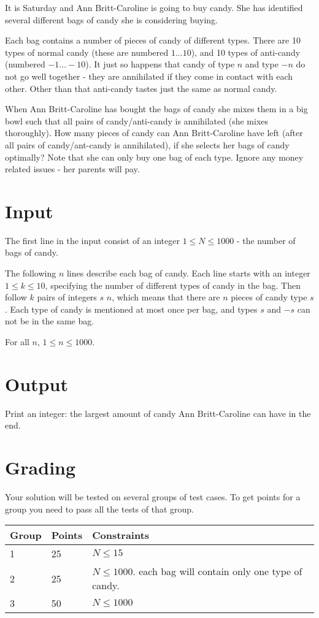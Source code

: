 
It is Saturday and Ann Britt-Caroline is going to buy candy. She has identified several different bags of candy she is considering buying.

Each bag contains a number of pieces of candy of different types. There are 10 types of normal candy (these are numbered $1...10$), and 10 types of anti-candy (numbered $-1...-10$). It just so happens that candy of type $n$ and type $-n$ do not go well together - they are annihilated if they come in contact with each other. Other than that anti-candy tastes just the same as normal candy.

When Ann Britt-Caroline has bought the bags of candy she mixes them in a big bowl such that all pairs of candy/anti-candy is annihilated (she mixes thoroughly). How many pieces of candy can Ann Britt-Caroline have left (after all pairs of candy/ant-candy is annihilated), if she selects her bags of candy optimally? Note that she can only buy one bag of each type. Ignore any money related issues - her parents will pay.
\section*{Input}

The first line in the input consist of an integer $1 \le N \le 1000$ - the number of bags of candy.

The following $n$ lines describe each bag of candy.
Each line starts with an integer $1 \le k \le 10$, specifying the number of different types of candy in the bag.
Then follow $k$ pairs of integers $s$ $n$, which means that there are $n$ pieces of candy type $s$.
Each type of candy is mentioned at most once per bag, and types $s$ and $-s$ can not be in the same bag.

For all $n$, $1 \le n \le 1000$.
\section*{Output}

Print an integer: the largest amount of candy Ann Britt-Caroline can have in the end.
\section*{Grading}
Your solution will be tested on several groups of test cases. To get points for a group you need to pass all the tests of that group.

\begin{tabular}{| l | l | l |}
	\hline
	Group & Points & Constraints\\ \hline
  1     & 25         & $N \le 15$ \\ \hline
  2     & 25         & $N \le 1000$. each bag will contain only one type of candy. \\ \hline
  3     & 50         & $N \le 1000$ \\ \hline
\end{tabular}
